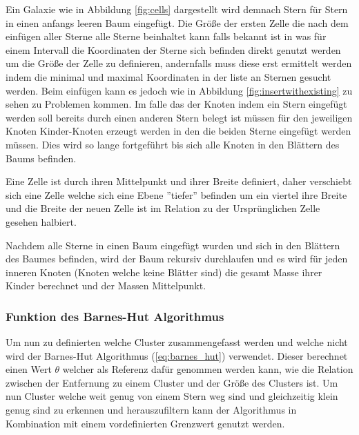 \par Ein Galaxie wie in Abbildung \ref{fig:cells} dargestellt wird demnach
Stern für Stern in einen anfangs leeren Baum eingefügt. Die Größe der ersten
Zelle die nach dem einfügen aller Sterne alle Sterne beinhaltet kann falls
bekannt ist in was für einem Intervall die Koordinaten der Sterne sich befinden
direkt genutzt werden um die Größe der Zelle zu definieren, andernfalls muss
diese erst ermittelt werden indem die minimal und maximal Koordinaten in der
liste an Sternen gesucht werden. Beim einfügen kann es jedoch wie in Abbildung
\ref{fig:insertwithexisting} zu sehen zu Problemen kommen. Im falle das der
Knoten indem ein Stern eingefügt werden soll bereits durch einen anderen Stern
belegt ist müssen für den jeweiligen Knoten Kinder-Knoten erzeugt werden in den
die beiden Sterne eingefügt werden müssen. Dies wird so lange fortgeführt bis
sich alle Knoten in den Blättern des Baums befinden.

\par Eine Zelle ist durch ihren Mittelpunkt und ihrer Breite definiert, daher
verschiebt sich eine Zelle welche sich eine Ebene ''tiefer'' befinden um ein
viertel ihre Breite und die Breite der neuen Zelle ist im Relation zu der
Ursprünglichen Zelle gesehen halbiert.

\par Nachdem alle Sterne in einen Baum eingefügt wurden und sich in den
Blättern des Baumes befinden, wird der Baum rekursiv durchlaufen und es wird
für jeden inneren Knoten (Knoten welche keine Blätter sind) die gesamt Masse
ihrer Kinder berechnet und der Massen Mittelpunkt.

\subsubsection{Funktion des Barnes-Hut Algorithmus}

Um nun zu definierten welche Cluster zusammengefasst werden und welche nicht
wird der Barnes-Hut Algorithmus (\ref{eq:barnes_hut}) verwendet. Dieser
berechnet einen Wert \( \theta \) welcher als Referenz dafür genommen werden
kann, wie die Relation zwischen der Entfernung zu einem Cluster und der Größe
des Clusters ist. Um nun Cluster welche weit genug von einem Stern weg sind und
gleichzeitig klein genug sind zu erkennen und herauszufiltern kann der
Algorithmus in Kombination mit einem vordefinierten Grenzwert genutzt werden.

